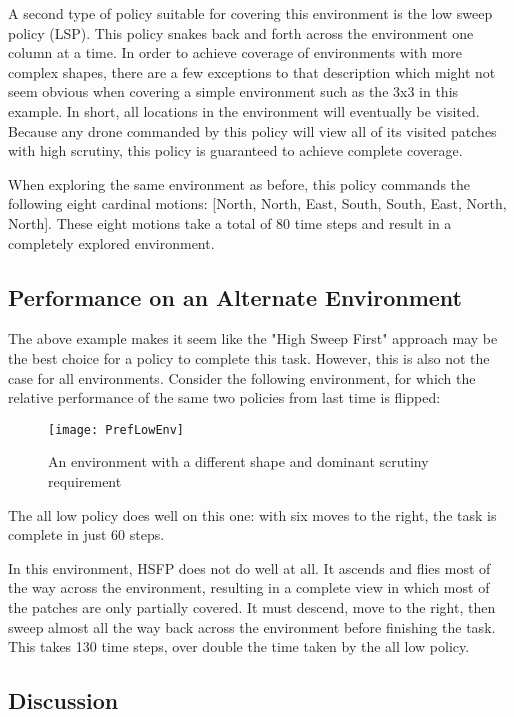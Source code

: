 A second type of policy suitable for covering this environment is the low sweep policy (LSP). This policy snakes back and forth across the environment one column at a time. In order to achieve coverage of environments with more complex shapes, there are a few exceptions to that description which might not seem obvious when covering a simple environment such as the 3x3 in this example. In short, all locations in the environment will eventually be visited. Because any drone commanded by this policy will view all of its visited patches with high scrutiny, this policy is guaranteed to achieve complete coverage.

When exploring the same environment as before, this policy commands the following eight cardinal motions: [North, North, East, South, South, East, North, North]. These eight motions take a total of 80 time steps and result in a completely explored environment.

\subsection{Performance on an Alternate Environment}

The above example makes it seem like the "High Sweep First" approach may be the best choice for a policy to complete this task. However, this is also not the case for all environments. Consider the following environment, for which the relative performance of the same two policies from last time is flipped:

\begin{figure}[H]
\texttt{[image: PrefLowEnv]}
\caption[Long Thin Environment]{An environment with a different shape and dominant scrutiny requirement}
\label{fig:3-2-env}
\end{figure}

The all low policy does well on this one: with six moves to the right, the task is complete in just 60 steps.

In this environment, HSFP does not do well at all. It ascends and flies most of the way across the environment, resulting in a complete view in which most of the patches are only partially covered. It must descend, move to the right, then sweep almost all the way back across the environment before finishing the task. This takes 130 time steps, over double the time taken by the all low policy.

\subsection{Discussion}


